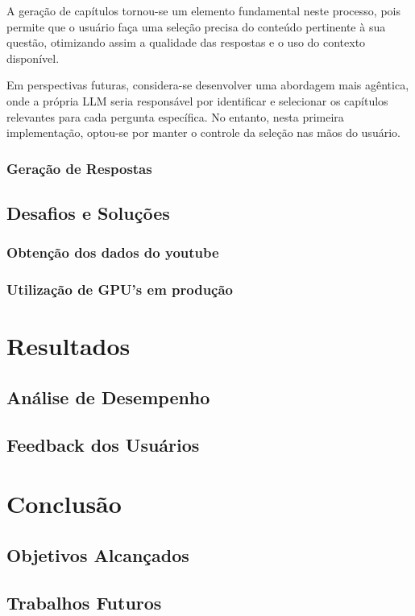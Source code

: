 \documentclass[tcc,capa]{texufpel}
\begin{document}
A geração de capítulos tornou-se um elemento fundamental neste processo, pois permite que o usuário faça uma seleção precisa do conteúdo pertinente à sua questão, otimizando assim a qualidade das respostas e o uso do contexto disponível.

Em perspectivas futuras, considera-se desenvolver uma abordagem mais agêntica, onde a própria LLM seria responsável por identificar e selecionar os capítulos relevantes para cada pergunta específica. No entanto, nesta primeira implementação, optou-se por manter o controle da seleção nas mãos do usuário.
\subsection{Geração de Respostas}

\section{Desafios e Soluções}
\subsection{Obtenção dos dados do youtube}
\subsection{Utilização de GPU's em produção}


\chapter{Resultados}
\section{Análise de Desempenho}
\section{Feedback dos Usuários}

\chapter{Conclusão}
\section{Objetivos Alcançados}
\section{Trabalhos Futuros}
\end{document}
